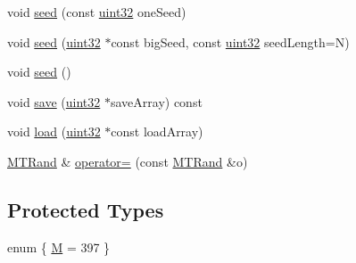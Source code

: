 \begin{CompactItemize}
\begin{CompactItemize}
\item 
void \hyperlink{classMTRand_1e21a79e0a30225fffe924229e34a923}{seed} (const \hyperlink{classMTRand_45478edf9e24dcd2a5164bac3889d6a2}{uint32} oneSeed)
\item 
void \hyperlink{classMTRand_5758103776b131e8ea46b6dc1b9fb267}{seed} (\hyperlink{classMTRand_45478edf9e24dcd2a5164bac3889d6a2}{uint32} $\ast$const bigSeed, const \hyperlink{classMTRand_45478edf9e24dcd2a5164bac3889d6a2}{uint32} seedLength=N)
\item 
void \hyperlink{classMTRand_d88ea3363d55bafb62826bbd130279c2}{seed} ()
\item 
void \hyperlink{classMTRand_d60e0f3f5c90baab75b74f9a2ccae871}{save} (\hyperlink{classMTRand_45478edf9e24dcd2a5164bac3889d6a2}{uint32} $\ast$saveArray) const 
\item 
void \hyperlink{classMTRand_8302e9a8cd16d8dfc536a85bf2f68be0}{load} (\hyperlink{classMTRand_45478edf9e24dcd2a5164bac3889d6a2}{uint32} $\ast$const loadArray)
\item 
\hyperlink{classMTRand}{MTRand} \& \hyperlink{classMTRand_3a6eb21add6f6ef4ce2d3280f2518521}{operator=} (const \hyperlink{classMTRand}{MTRand} \&o)
\end{CompactItemize}
\subsection*{Protected Types}
\begin{CompactItemize}
\item 
enum \{ \hyperlink{classMTRand_10c3437be98225f5b0beee1ed8c033c8133070000b798889cd75535ea0d5bb71}{M} =  397
 \}

\end{CompactItemize}
\end{CompactItemize}
